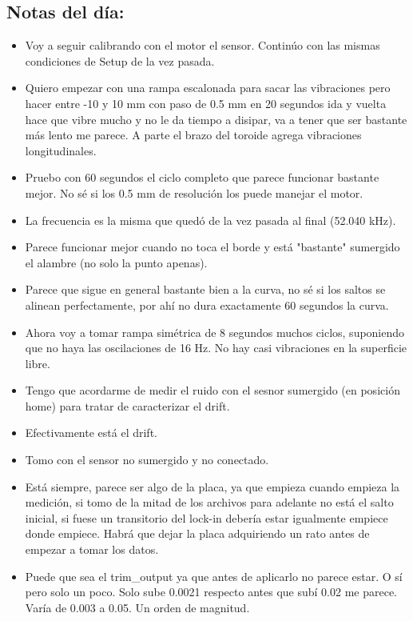 \subsection*{Notas del día:}
\begin{itemize}
	\item Voy a seguir calibrando con el motor el sensor. Continúo con las mismas condiciones de Setup de la vez pasada. 
	\item Quiero empezar con una rampa escalonada para sacar las vibraciones pero hacer entre -10 y 10 mm con paso de 0.5 mm en 20 segundos ida y vuelta hace que vibre mucho y no le da tiempo a disipar, va a tener que ser bastante más lento me parece. A parte el brazo del toroide agrega vibraciones longitudinales.   
	\item Pruebo con 60 segundos el ciclo completo que parece funcionar bastante mejor. No sé si los 0.5 mm de resolución los puede manejar el motor. 
	\item La frecuencia es la misma que quedó de la vez pasada al final (52.040 kHz). 
	\item Parece funcionar mejor cuando no toca el borde y está "bastante" sumergido el alambre (no solo la punto apenas). 
	
	\item Parece que sigue en general bastante bien a la curva, no sé si los saltos se alinean perfectamente, por ahí no dura exactamente 60 segundos la curva. 
	
	\item Ahora voy a tomar rampa simétrica de 8 segundos muchos ciclos, suponiendo que no haya las oscilaciones de 16 Hz. No hay casi vibraciones en la superficie libre.  
	\item Tengo que acordarme de medir el ruido con el sesnor sumergido (en posición home) para tratar de caracterizar el drift. 
	\item Efectivamente está el drift. 
	
	\item Tomo con el sensor no sumergido y no conectado. 
	
	\item Está siempre, parece ser algo de la placa, ya que empieza cuando empieza la medición, si tomo de la mitad de los archivos para adelante no está el salto inicial, si fuese un transitorio del lock-in debería estar igualmente empiece donde empiece. Habrá que dejar la placa adquiriendo un rato antes de empezar a tomar los datos. 
	\item Puede que sea el trim\_output ya que antes de aplicarlo no parece estar. O sí pero solo un poco. Solo sube 0.0021 respecto antes que subí 0.02 me parece. Varía de 0.003 a 0.05. Un orden de magnitud. 
	

\end{itemize}
